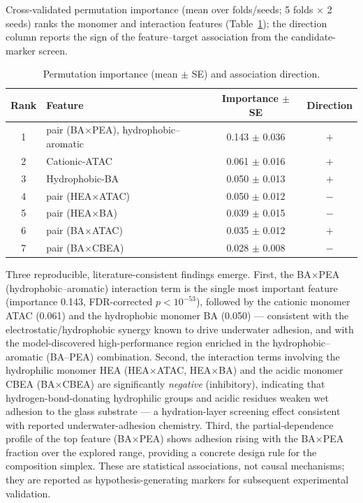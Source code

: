 \documentclass[utf8]{frontiers_suppmat}
\begin{document}
Cross-validated permutation importance (mean over folds/seeds; 5 folds
$\times$ 2 seeds) ranks the monomer and interaction features
(Table~\ref{tab:interp}); the direction column reports the sign of the
feature--target association from the candidate-marker screen.

\begin{table}[h]
\centering
\caption{Permutation importance (mean $\pm$ SE) and association direction.}
\label{tab:interp}
\begin{tabular}{clcc}
\toprule
Rank & Feature & Importance $\pm$ SE & Direction \\
\midrule
1 & pair (BA$\times$PEA), hydrophobic--aromatic & 0.143 $\pm$ 0.036 & $+$ \\
2 & Cationic-ATAC & 0.061 $\pm$ 0.016 & $+$ \\
3 & Hydrophobic-BA & 0.050 $\pm$ 0.013 & $+$ \\
4 & pair (HEA$\times$ATAC) & 0.050 $\pm$ 0.012 & $-$ \\
5 & pair (HEA$\times$BA) & 0.039 $\pm$ 0.015 & $-$ \\
6 & pair (BA$\times$ATAC) & 0.035 $\pm$ 0.012 & $+$ \\
7 & pair (BA$\times$CBEA) & 0.028 $\pm$ 0.008 & $-$ \\
\bottomrule
\end{tabular}
\end{table}

Three reproducible, literature-consistent findings emerge. First, the
BA$\times$PEA (hydrophobic--aromatic) interaction term is the single most
important feature (importance 0.143, FDR-corrected $p < 10^{-53}$), followed
by the cationic monomer ATAC (0.061) and the hydrophobic monomer BA (0.050)
--- consistent with the electrostatic/hydrophobic synergy known to drive
underwater adhesion, and with the model-discovered high-performance region
enriched in the hydrophobic--aromatic (BA--PEA) combination. Second, the
interaction terms involving the hydrophilic monomer HEA (HEA$\times$ATAC,
HEA$\times$BA) and the acidic monomer CBEA (BA$\times$CBEA) are significantly
\emph{negative} (inhibitory), indicating that hydrogen-bond-donating
hydrophilic groups and acidic residues weaken wet adhesion to the glass
substrate --- a hydration-layer screening effect consistent with reported
underwater-adhesion chemistry. Third, the partial-dependence profile of the
top feature (BA$\times$PEA) shows adhesion rising with the BA$\times$PEA
fraction over the explored range, providing a concrete design rule for the
composition simplex. These are statistical associations, not causal
mechanisms; they are reported as hypothesis-generating markers for subsequent
experimental validation.
\end{document}
